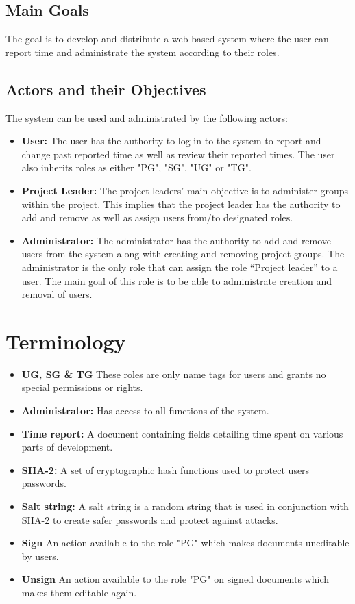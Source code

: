 \documentclass{article}
\begin{document}
\subsection{Main Goals}

The goal is to develop and distribute a web-based system where the user can report time and administrate the system according to their roles.

\subsection{Actors and their Objectives}
The system can be used and administrated by the following actors:

\begin{itemize}
  \item \textbf{User:} The user has the authority to log in to the system to report and  change past reported time as well as review their reported times. The user also inherits roles as either "PG", "SG", "UG" or "TG".
  \item \textbf{Project Leader:}
  The project leaders' main objective is to administer groups within the project. This implies that the project leader has the authority to add and remove as well as assign users from/to designated roles.
   \item \textbf{Administrator:} The administrator has the authority to add and remove users from the system along with creating and removing project groups. The administrator is the only role that can assign the role “Project leader” to a user. The main goal of this role is to be able to administrate creation and removal of users.
\end{itemize}


\section{Terminology}

\begin{itemize}
\item \textbf{UG, SG \& TG} These roles are only name tags for  users and grants no special permissions or rights.
\item \textbf{Administrator:} 
  Has access to all functions of the system.
\item \textbf{Time report:}
  A document containing fields detailing time spent on various parts of development.
\item \textbf{SHA-2:}
  A set of cryptographic hash functions used to protect users passwords.
\item \textbf{Salt string:}
  A salt string is a random string that is used in conjunction with SHA-2 to create safer passwords and protect against attacks.
\item \textbf{Sign}
  An action available to the role "PG" which makes documents uneditable by users.
\item \textbf{Unsign}
  An action available to the role "PG" on signed documents which makes them editable again. 
\end{itemize}
\end{document}
